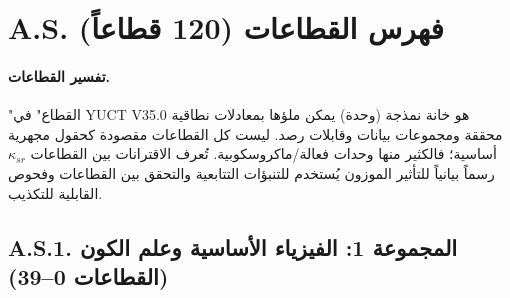 \documentclass[13pt,a4paper]{article}
\begin{document}
	
	\tableofcontents
	\newpage
	
	\section*{A.S. فهرس القطاعات (120 قطاعاً)}
	\label{sec:sector-catalog}
	\paragraph{تفسير القطاعات.}
	"القطاع" في YUCT V35.0 هو خانة نمذجة (وحدة) يمكن ملؤها بمعادلات نطاقية محققة ومجموعات بيانات وقابلات رصد. ليست كل القطاعات مقصودة كحقول مجهرية أساسية؛ فالكثير منها وحدات فعالة/ماكروسكوبية. تُعرف الاقترانات بين القطاعات $\kappa_{sr}$ رسماً بيانياً للتأثير الموزون يُستخدم للتنبؤات التتابعية والتحقق بين القطاعات وفحوص القابلية للتكذيب.
	
	\subsection*{A.S.1. المجموعة 1: الفيزياء الأساسية وعلم الكون (القطاعات 0--39)}
	
\end{document}
